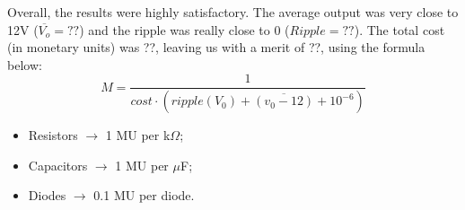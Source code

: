 \clearpage

Overall, the results were highly satisfactory. The average output was very close to 12V ($\overline{V_{o}}=??$)
and the ripple was really close to 0 ($Ripple=??$).
The total cost (in monetary units) was ??, leaving us with a merit of ??, using the formula below:
\begin{equation}
  M=\dfrac{1}{cost\cdot \left( ripple\left( V_{0}\right) +\overline{\left( v_{0}-12\right) }+10^{-6}\right) }
\end{equation}
\begin{itemize}
  \item Resistors $\rightarrow$ 1 MU per k$\Omega$;
  \item Capacitors $\rightarrow$ 1 MU per $\mu$F;
  \item Diodes $\rightarrow$ 0.1 MU per diode.
\end{itemize}
